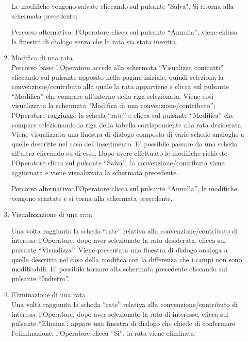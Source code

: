 \begin{enumerate}
Le modifiche vengono salvate cliccando sul pulsante "Salva". Si ritorna alla schermata precedente;

Percorso alternativo:
l'Operatore clicca sul pulsante ``Annulla'', viene chiusa la finestra di dialogo senza che la rata sia stata inserita.

\item Modifica di una rata\\

Percorso base:
l'Operatore accede alla schermata ``Visualizza contratti'' cliccando sul pulsante apposito nella pagina iniziale, quindi seleziona la convenzione/contributo alla quale la rata appartiene e clicca sul pulsante ``Modifica'' che compare
all'interno della riga selezionata. Viene così visualizzata la schermata ``Modifica di una convenzione/contributo''; l'Operatore raggiunge la scheda ``rate'' e clicca sul pulsante ``Modifica'' che compare selezionando la riga della tabella
corrispondente alla rata desiderata. Viene visualizzata una finestra di dialogo composta di varie schede analoghe a quelle descritte nel caso dell'inserimento. E' possibile passare da una scheda all'altra cliccando su di esse.
Dopo avere effettuato le modifiche richieste l'Operatore clicca sul pulsante ``Salva'', la convenzione/contributo viene aggiornata e viene visualizzata la schermata precedente.

Percorso alternativo:
l'Operatore clicca sul pulsante ``Annulla'', le modifiche vengono scartate e si torna alla schermata precedente.

\item Visualizzazione di una rata

Una volta raggiunta la scheda ``rate'' relativa alla convenzione/contributo di interesse l'Operatore, dopo aver selezionato la rata desiderata, clicca sul pulsante ``Visualizza''. Viene presentata una finestra di dialogo analoga a quella descritta nel caso della modifica 
con la differenza che i campi non sono modificabili. E' possibile tornare alla schermata precedente cliccando sul pulsante ``Indietro''.

\item Eliminazione di una rata\\

Una volta raggiunta la scheda ``rate'' relativa alla convenzione/contributo di interesse l'Operatore, dopo aver selezionato la rata di interesse, clicca sul pulsante ``Elimina'; appare una finestra di dialogo che chiede di confermare
l'eliminazione, l'Operatore clicca ''Sì'', la rata viene eliminata.



\end{enumerate}

